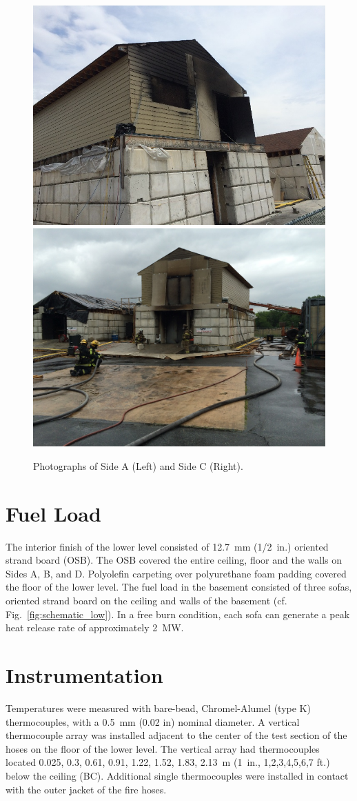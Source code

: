 \documentclass[letterpaper,11pt]{texMemo} %
\begin{document}
\begin{figure}[!ht]
\centering
\includegraphics[width=0.45\columnwidth]{../Figures/Hose_Figures/exterior_a}
\includegraphics[width=0.45\columnwidth]{../Figures/Hose_Figures/exterior_c}
\caption{Photographs of Side A (Left) and Side C (Right). }
\label{fig:exterior}
\end{figure}

\section{Fuel Load}
The interior finish of the lower level consisted of 12.7~mm (1/2~in.) oriented strand board (OSB).  The OSB covered the entire ceiling, floor and the walls on Sides A, B, and D. Polyolefin carpeting over polyurethane foam padding covered the floor of the lower level.  The fuel load in the basement consisted of three sofas, oriented strand board on the ceiling and walls of the basement (cf. Fig.~\ref{fig:schematic_low}).  In a free burn condition, each sofa can generate a peak heat release rate of approximately 2~MW.

\section{Instrumentation}
Temperatures were measured with bare-bead, Chromel-Alumel (type K) thermocouples, with a 0.5~mm (0.02 in) nominal diameter. A vertical thermocouple array was installed adjacent to the center of the test section of the hoses on the floor of the lower level. The vertical array had thermocouples located 0.025, 0.3, 0.61, 0.91, 1.22, 1.52, 1.83, 2.13~m (1~in., 1,2,3,4,5,6,7 ft.) below the ceiling (BC).  Additional single thermocouples were installed in contact with the outer jacket of the fire hoses.  
\end{document}
